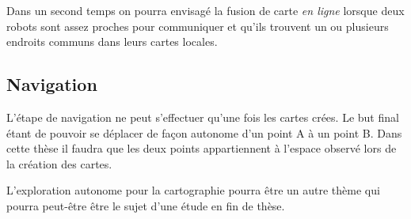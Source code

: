 Dans un second temps on pourra envisagé la fusion de carte \emph{en ligne} lorsque deux robots sont assez proches pour communiquer et qu'ils trouvent un ou plusieurs endroits communs dans leurs cartes locales.

\subsection{Navigation}

L'étape de navigation ne peut s'effectuer qu'une fois les cartes crées.
Le but final étant de pouvoir se déplacer de façon autonome d'un point A à un point B.
Dans cette thèse il faudra que les deux points appartiennent à l'espace observé lors de la création des cartes.



L'exploration autonome pour la cartographie pourra être un autre thème qui pourra peut-être être le sujet d'une étude en fin de thèse.



